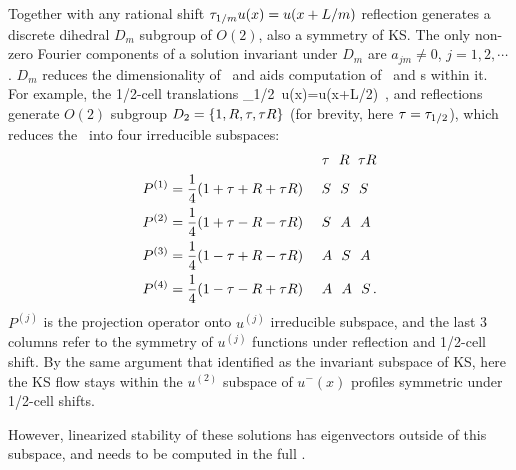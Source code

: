 {Together with any rational shift
$ \tau_{1/m}u(x)=u(x+L/m)$
reflection generates a discrete dihedral $D_m$
subgroup of $O(2)$, also a symmetry of KS.
The only non-zero Fourier components of a solution invariant
under $D_m$ are $a_{jm} \neq 0$, $j =1,2,\cdots$ .
$D_m$ reduces the dimensionality
of \statesp\ and aids computation of \eqva\ and \po s
within it. For example, the 1/2-cell translations 
\beq
    \Shift_{1/2}\, u(x)=u(x+L/2)
\,,
and reflections generate $O(2)$
subgroup $D_2 = \{1, \Refl,\Shift,\Shift\Refl\}$ (for brevity, here $\Shift = \Shift_{1/2}$),
which
reduces the \statesp\ into four irreducible subspaces:
\begin{align}
 & \qquad\qquad\qquad\qquad\qquad
              ~~~ \Shift ~~ \Refl  ~\;  \Shift\Refl
    \nnu\\
P^{(1)} &= \frac{1}{4} (1 + \Shift + \Refl + \Shift\Refl)
           ~~~~  S  ~~  S   ~~   S
    \nnu\\
P^{(2)} &= \frac{1}{4} (1 + \Shift - \Refl - \Shift\Refl)
            ~~~~  S  ~~  A   ~~   A
    \nnu\\
P^{(3)} &= \frac{1}{4} (1 - \Shift + \Refl - \Shift\Refl)
           ~~~~  A  ~~  S   ~~   A
     \label{ek_defn}\\
P^{(4)} &= \frac{1}{4} (1 - \Shift - \Refl + \Shift\Refl)
          ~~~~  A  ~~  A   ~~   S
\,.
    \nnu
\end{align}
$P^{(j)}$ is the projection operator onto
$u^{(j)}$ irreducible subspace, and the last 3 columns
refer to the symmetry of
$u^{(j)}$ functions under reflection and
1/2-cell shift.
By the same argument that identified  as
the invariant subspace of KS, here the KS flow
stays within the $u^{(2)}$ subspace
of $u^-(x)$ profiles symmetric under 1/2-cell shifts.


  However, linearized stability of these solutions has
eigenvectors outside of this subspace, and needs to be
computed in the full \statesp.

}

